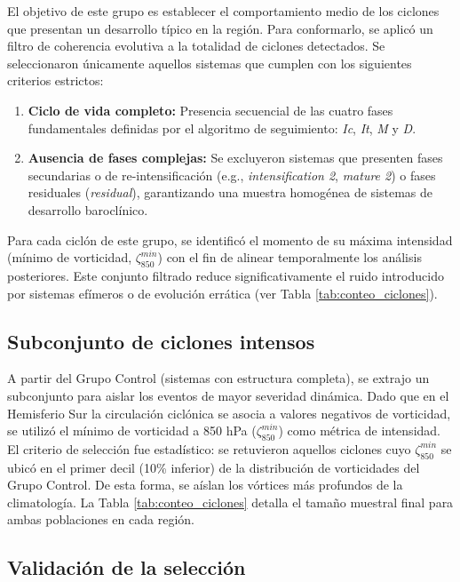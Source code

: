 El objetivo de este grupo es establecer el comportamiento medio de los ciclones que presentan un desarrollo típico en la región. Para conformarlo, se aplicó un filtro de coherencia evolutiva a la totalidad de ciclones detectados. Se seleccionaron únicamente aquellos sistemas que cumplen con los siguientes criterios estrictos:

\begin{enumerate}
    \item \textbf{Ciclo de vida completo:} Presencia secuencial de las cuatro fases fundamentales definidas por el algoritmo de seguimiento: \textit{Ic}, \textit{It}, \textit{M} y \textit{D}.
    \item \textbf{Ausencia de fases complejas:} Se excluyeron sistemas que presenten fases secundarias o de re-intensificación (e.g., \textit{intensification 2}, \textit{mature 2}) o fases residuales (\textit{residual}), garantizando una muestra homogénea de sistemas de desarrollo baroclínico.
\end{enumerate}

Para cada ciclón de este grupo, se identificó el momento de su máxima intensidad (mínimo de vorticidad, $\zeta_{850}^{min}$) con el fin de alinear temporalmente los análisis posteriores. Este conjunto filtrado reduce significativamente el ruido introducido por sistemas efímeros o de evolución errática (ver Tabla \ref{tab:conteo_ciclones}).

\subsection{Subconjunto de ciclones intensos}\label{subsec:grupo_intenso}

A partir del Grupo Control (sistemas con estructura completa), se extrajo un subconjunto para aislar los eventos de mayor severidad dinámica. Dado que en el Hemisferio Sur la circulación ciclónica se asocia a valores negativos de vorticidad, se utilizó el mínimo de vorticidad a 850 hPa ($\zeta_{850}^{min}$) como métrica de intensidad. El criterio de selección fue estadístico: se retuvieron aquellos ciclones cuyo $\zeta_{850}^{min}$ se ubicó en el primer decil (10\% inferior) de la distribución de vorticidades del Grupo Control. De esta forma, se aíslan los vórtices más profundos de la climatología. La Tabla \ref{tab:conteo_ciclones} detalla el tamaño muestral final para ambas poblaciones en cada región.



\subsection{Validación de la selección}

